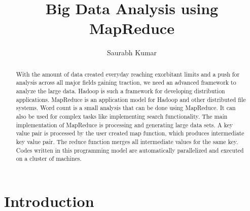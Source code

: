 \documentclass[sigconf]{acmart}
\begin{document}
\title{Big Data Analysis using MapReduce}


\author{Saurabh Kumar}

\renewcommand{\shortauthors}{B. Trovato et al.}


\begin{abstract}
With the amount of data created everyday reaching exorbitant limits and a push for analysis across all major fields gaining traction, we need an advanced framework to analyze the large data. Hadoop is such a framework for developing distribution applications. MapReduce is an application model for Hadoop and other distributed file systems. Word count is a small analysis that can be done using MapReduce. It can also be used for complex tasks like implementing search functionality. The main implementation of MapReduce is processing and generating large data sets. A key value pair is processed by the user created map function, which produces intermediate key value pair. The reduce function merges all intermediate values for the same key. Codes written in this programming model are automatically parallelized and executed on a cluster of machines.
\end{abstract}



\maketitle

\section{Introduction}
\end{document}
